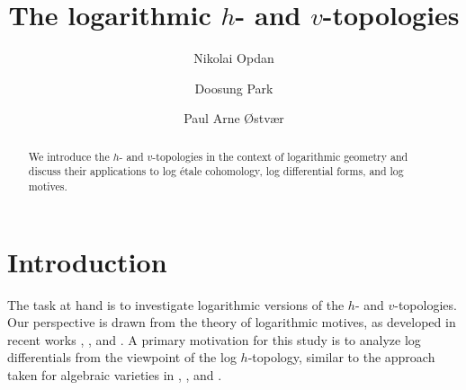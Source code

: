 \documentclass[10pt]{amsart}
\begin{document}
\author{Nikolai Opdan}
\address{Department of Mathematics, University of Oslo, 
Niels Henrik Abels hus, Moltke Moes vei 35, 0851 Oslo, Norway}

\author{Doosung Park}
\address{Bergische Universit{\"a}t Wuppertal,
Fakult{\"a}t Mathematik und Naturwissenschaften
\\
Gau{\ss}strasse 20, 42119 Wuppertal, Germany}

\author{Paul Arne {\O}stv{\ae}r}
\address{Dipartimento di Matematica ``Federigo Enriques'', 
Universit\`a degli Studi di Milano, Via Cesare Saldini 50, 20133 Milano, Italy} 
\address{Department of Mathematics, University of Oslo, 
Niels Henrik Abels hus, Moltke Moes vei 35, 0851 Oslo, Norway}


\title{The logarithmic $h$- and $v$-topologies}
\begin{abstract}
We introduce the $h$- and $v$-topologies in the context of logarithmic geometry 
and discuss their applications to log étale cohomology, 
log differential forms, 
and log motives.
\end{abstract}
\maketitle

\tableofcontents

\section{Introduction}

The task at hand is to investigate logarithmic versions of the $h$- and $v$-topologies. Our perspective is drawn from the theory of logarithmic motives, as developed in recent works \cite{logDMcras}, \cite{logDM}, and \cite{logSH}. A primary motivation for this study is to analyze log differentials from the viewpoint of the log $h$-topology, similar to the approach taken for algebraic varieties in \cite{ERTL20195285}, \cite{HuberJorder}, and \cite{Huber}.
\end{document}
